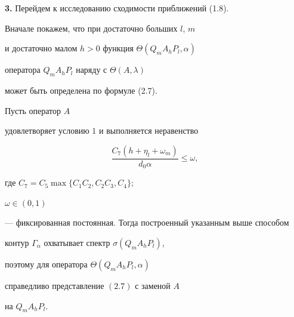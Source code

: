 {\bf 3.} Перейдем к исследованию сходимости приближений (1.8).


Вначале покажем, что при достаточно больших $l$, $m$


и достаточно малом $h>0$ функция $ \Theta(Q_m A_h P_l, \alpha)$


оператора $Q_m A_h P_l$ наряду с $\Theta (A, \lambda)$


может быть определена по формуле (2.7).





\begin{lem}


Пусть оператор $A$


удовлетворяет условию $1$ и выполняется неравенство


\begin{equation}


\frac{C_7(h + \eta_l + \omega_m)}{d_0 \alpha}\leq \omega,


\tag{3.1}


\end{equation}


где $C_7=C_5 \max \{ C_1 C_2, C_2 C_3 , C_4 \};$


$\omega \in (0,1)$


--- фиксированная постоянная. Тогда построенный указанным выше способом


контур $\Gamma_{\alpha}$ охватывает спектр $\sigma (Q_m A_h P_l)$,


поэтому для оператора $\Theta(Q_m A_h P_l,\alpha)$


справедливо представление $(2.7)$ с заменой $A$


на $Q_m A_h P_l$.


\end{lem}





